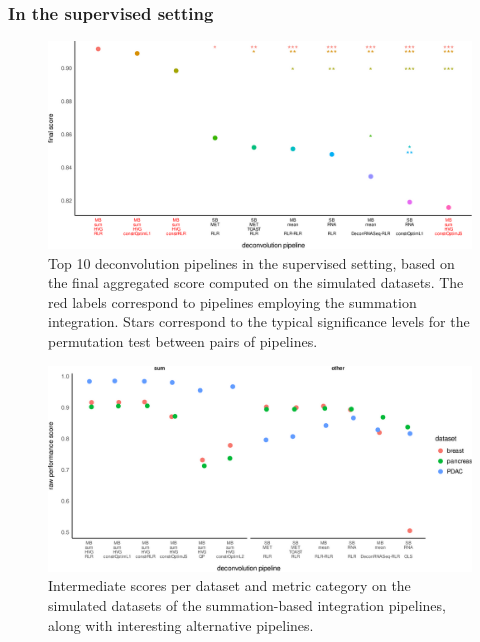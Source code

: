 \documentclass{article}
\begin{document}
\subsubsection{In the supervised setting}\label{subsubsec:results-supervised}

\begin{figure}[htp]
    \centering
    \includegraphics[width=\textwidth,keepaspectratio]{fig/sup_simu_topsignif.png}
    \caption{Top 10 deconvolution pipelines in the supervised setting, based on the final aggregated score computed on the simulated datasets. The red labels correspond to pipelines employing the summation integration. Stars correspond to the typical significance levels for the permutation test between pairs of pipelines.}
    \label{fig:sup_simu_topsignif}
\end{figure}

\begin{figure}[htp]
    \centering
    \includegraphics[width=\textwidth,keepaspectratio]{fig/sup_simu_sumtop.png}
    \caption{Intermediate scores per dataset and metric category on the simulated datasets of the summation-based integration pipelines, along with interesting alternative pipelines.}
    \label{fig:sup_simu_sumtop}
\end{figure}
\end{document}

